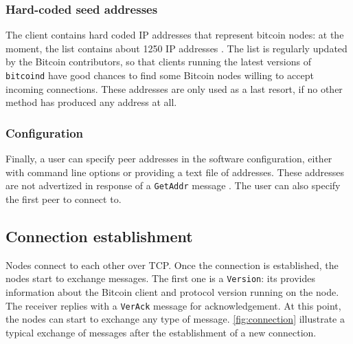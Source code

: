 \subsubsection{Hard-coded seed addresses}
The client contains hard coded IP addresses that represent bitcoin nodes:
at the moment, the list contains about \num{1250} IP addresses \cite{bitcoin_seeds}.
The list is regularly updated by the Bitcoin contributors, so that clients running the latest versions of \texttt{bitcoind} have good chances to find some Bitcoin nodes willing to accept incoming connections.
These addresses are only used as a last resort, if no other method has produced any address at all.

\subsubsection{Configuration}
Finally, a user can specify peer addresses in the software configuration, either with command line options or providing a text file of addresses.
These addresses are not advertized in response of a \texttt{GetAddr} message \cite{bitcoin_peer_discovery}.
The user can also specify the first peer to connect to.

\subsection{Connection establishment}
Nodes connect to each other over TCP.
Once the connection is established, the nodes start to exchange messages.
The first one is a \texttt{Version}:
its provides information about the Bitcoin client and protocol version running on the node.
The receiver replies with a \texttt{VerAck} message for acknowledgement.
At this point, the nodes can start to exchange any type of message.
\cref{fig:connection} illustrate a typical exchange of messages after the establishment of a new connection.

